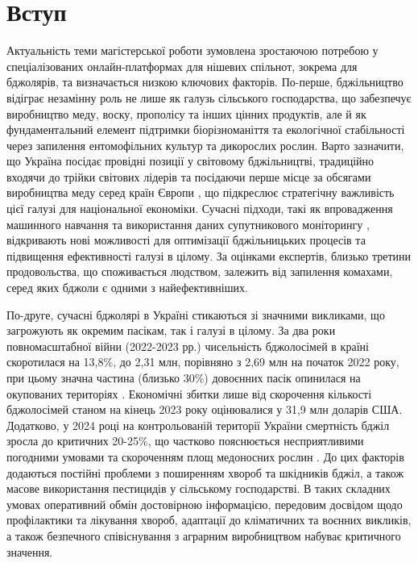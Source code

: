 \chapter*{Вступ}
\label{ch:introduction}

Актуальність теми магістерської роботи зумовлена зростаючою потребою у спеціалізованих онлайн-платформах для нішевих спільнот, зокрема для бджолярів, та визначається низкою ключових факторів. По-перше, бджільництво відіграє незамінну роль не лише як галузь сільського господарства, що забезпечує виробництво меду, воску, прополісу та інших цінних продуктів, але й як фундаментальний елемент підтримки біорізноманіття та екологічної стабільності через запилення ентомофільних культур та дикорослих рослин. Варто зазначити, що Україна посідає провідні позиції у світовому бджільництві, традиційно входячи до трійки світових лідерів та посідаючи перше місце за обсягами виробництва меду серед країн Європи \cite{unian2015honeyRank}, що підкреслює стратегічну важливість цієї галузі для національної економіки.
Сучасні підходи, такі як впровадження машинного навчання \cite{volohovich2024machinelearning} та використання даних супутникового моніторингу \cite{volohovich2024satellite}, відкривають нові можливості для оптимізації бджільницьких процесів та підвищення ефективності галузі в цілому.
За оцінками експертів, близько третини продовольства, що споживається людством, залежить від запилення комахами, серед яких бджоли є одними з найефективніших.

По-друге, сучасні бджолярі в Україні стикаються зі значними викликами, що загрожують як окремим пасікам, так і галузі в цілому. За два роки повномасштабної війни (2022-2023 рр.) чисельність бджолосімей в країні скоротилася на 13,8\%, до 2,31 млн, порівняно з 2,69 млн на початок 2022 року, при цьому значна частина (близько 30\%) довоєнних пасік опинилася на окупованих територіях \cite{skilky2025beeMortality}. Економічні збитки лише від скорочення кількості бджолосімей станом на кінець 2023 року оцінювалися у 31,9 млн доларів США. Додатково, у 2024 році на контрольованій території України смертність бджіл зросла до критичних 20-25\%, що частково пояснюється несприятливими погодними умовами та скороченням площ медоносних рослин \cite{skilky2025beeMortality}. До цих факторів додаються постійні проблеми з поширенням хвороб та шкідників бджіл, а також масове використання пестицидів у сільському господарстві. В таких складних умовах оперативний обмін достовірною інформацією, передовим досвідом щодо профілактики та лікування хвороб, адаптації до кліматичних та воєнних викликів, а також безпечного співіснування з аграрним виробництвом набуває критичного значення.

